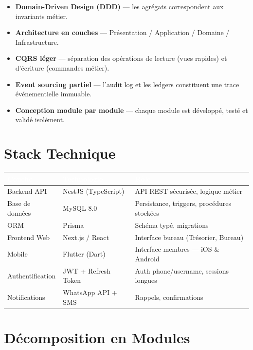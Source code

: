 \documentclass[12pt, a4paper]{report}
\begin{document}
\begin{itemize}
  \item \textbf{Domain-Driven Design (DDD)} — les agrégats correspondent aux invariants métier.
  \item \textbf{Architecture en couches} — Présentation / Application / Domaine / Infrastructure.
  \item \textbf{CQRS léger} — séparation des opérations de lecture (vues rapides) et d'écriture (commandes métier).
  \item \textbf{Event sourcing partiel} — l'audit log et les ledgers constituent une trace événementielle immuable.
  \item \textbf{Conception module par module} — chaque module est développé, testé et validé isolément.
\end{itemize}

\section{Stack Technique}

\begin{center}
\begin{tabular}{L{3.5cm}L{4.5cm}L{5cm}}
  \toprule
  \textcolor{white}{\textbf{Couche}} &
  \textcolor{white}{\textbf{Technologie}} &
  \textcolor{white}{\textbf{Rôle}} \\
  \midrule
  Backend API      & NestJS (TypeScript)   & API REST sécurisée, logique métier \\
  Base de données  & MySQL 8.0             & Persistance, triggers, procédures stockées \\
  ORM              & Prisma                & Schéma typé, migrations \\
  Frontend Web     & Next.js / React       & Interface bureau (Trésorier, Bureau) \\
  Mobile           & Flutter (Dart)        & Interface membres — iOS \& Android \\
  Authentification & JWT + Refresh Token   & Auth phone/username, sessions longues \\
  Notifications    & WhatsApp API + SMS    & Rappels, confirmations \\
  \bottomrule
\end{tabular}
\end{center}

\section{Décomposition en Modules}
\end{document}
